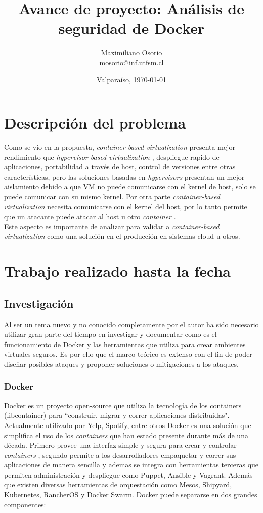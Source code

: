 \documentclass[letter,10pt]{article}
\title{Avance de proyecto: Análisis de seguridad de Docker}
\author{Maximiliano Osorio \\ mosorio@inf.utfsm.cl}
\date{Valparaíso, \today}
\begin{document}
\maketitle

\newcommand{\container}{\textit{container }}
\newcommand{\containers}{\textit{containers }}

\section{Descripción del problema}
Como se vio en la propuesta, \textit{container-based virtualization} presenta mejor rendimiento que \textit{hypervisor-based virtualization} \cite{padala2007performance}, despliegue rapido de aplicaciones, portabilidad a través de host, control de versiones entre otras características\cite{Redhat:2015:Online}, pero las soluciones basadas en \textit{hypervisors} presentan un mejor aislamiento debido a que VM no puede comunicarse con el kernel de host, solo se puede comunicar con su mismo kernel. Por otra parte  \textit{container-based virtualization} necesita comunicarse con el kernel del host, por lo tanto permite que un atacante puede atacar al host u otro \container.\\ Este aspecto es importante de analizar para validar a \textit{container-based virtualization} como una solución en el producción en sistemas cloud u otros. 


\section{Trabajo realizado hasta la fecha}
\subsection{Investigación}
Al ser un tema nuevo y no conocido completamente por el autor ha sido necesario utilizar gran parte del tiempo en investigar y documentar como es el funcionamiento de Docker y las herramientas que utiliza para crear ambientes virtuales seguros. Es por ello que el marco teórico es extenso con el fin de poder diseñar posibles ataques y proponer soluciones o mitigaciones  a los ataques.
\subsubsection{Docker}
Docker es un proyecto open-source que utiliza la tecnología de los containers (libcontainer) para ``construir, migrar y correr aplicaciones distribuidas". Actualmente utilizado por Yelp, Spotify, entre otros \cite{Docker:2015:Online} \cite{marmolnetworking}
Docker es una solución que simplifica el uso de los \containers que han estado presente durante más de una década. Primero provee una interfaz simple y segura para crear y controlar \textit{containers} \cite{bui2015analysis}, segundo permite a los desarrolladores empaquetar y correr sus aplicaciones de manera sencilla y ademas se integra con herramientas terceras que permiten administración y despliegue como Puppet, Ansible y Vagrant. Además que existen diversas herramientas de orquestación como Mesos, Shipyard, Kubernetes, RancherOS y Docker Swarm. %
  Docker puede separarse en dos grandes componentes: 
  
\end{document}
